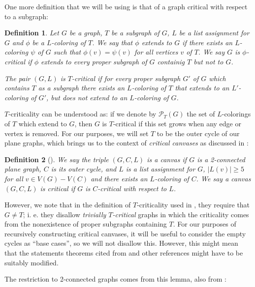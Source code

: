 \documentclass{article}
\newtheorem{definition}{Definition}
\begin{document}
One more definition that we will be using is that of a graph critical with respect to a subgraph:

\begin{definition}
Let $G$ be a graph, $T$ be a subgraph of $G$, $L$ be a list assignment for $G$ and $\phi$ be a $L$-coloring of $T$. We say that $\phi$ \emph{extends to $G$} if there exists an $L$-coloring $\psi$ of $G$ such that $\phi(v) = \psi(v)$ for all vertices $v$ of $T$. We say $G$ is $\phi$-critical if $\phi$ extends to every proper subgraph of $G$ containig $T$ but not to $G$. 

The pair $(G, L)$ is \emph{$T$-critical} if for every proper subgraph $G'$ of $G$ which contains $T$ as a subgraph there exists an $L$-coloring of $T$ that extends to an $L'$-coloring of $G'$, but does not extend to an $L$-coloring of $G$.
\end{definition}

$T$-criticality can be understood as: if we denote by $\mathcal{P}_T (G)$ the set of $L$-colorings of $T$ which extend to $G$, then $G$ is $T$-critical if this set grows when any edge or vertex is removed. For our purposes, we will set $T$ to be the outer cycle of our plane graphs, which brings us to the context of \emph{critical canvases} as discussed in \cite{fivelistcoloring2}:

\begin{definition}[\cite{fivelistcoloring2}]
We say the triple $(G, C, L)$ is a \emph{canvas} if $G$ is a 2-connected plane graph, $C$ is its outer cycle, and $L$ is a list assignment for $G$, $|L(v)| \geq 5$ for all $v \in V(G)-V(C)$ and there exists an $L$-coloring of $C$. We say a canvas $(G, C, L)$ is \emph{critical} if $G$ is $C$-critical with respect to $L$.
\end{definition}

However, we note that in the definition of $T$-criticality used in \cite{fivelistcoloring2}, they require that $G \neq T$; i. e. they disallow \emph{trivially $T$-critical} graphs in which the criticality comes from the nonexistence of proper subgraphs containing $T$. For our purposes of recursively constructing critical canvases, it will be useful to consider the empty cycles as ``base cases'', so we will not disallow this. However, this might mean that the statements theorems cited from \cite{fivelistcoloring2} and other references might have to be suitably modified.

The restriction to 2-connected graphs comes from this lemma, also from \cite{fivelistcoloring2}:
\end{document}
